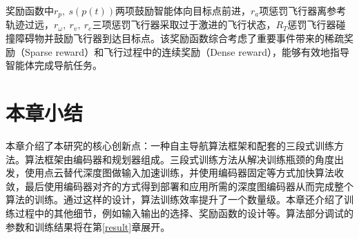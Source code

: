 奖励函数中$r_p,\ s(p(t))$两项鼓励智能体向目标点前进，$r_a$项惩罚飞行器离参考轨迹过远，$r_\omega,\ r_v,\ r_e$三项惩罚飞行器采取过于激进的飞行状态，$R_T$惩罚飞行器碰撞障碍物并鼓励飞行器到达目标点。该奖励函数综合考虑了重要事件带来的稀疏奖励（Sparse reward）和飞行过程中的连续奖励（Dense reward），能够有效地指导智能体完成导航任务。

\section{本章小结}

本章介绍了本研究的核心创新点：一种自主导航算法框架和配套的三段式训练方法。算法框架由编码器和规划器组成。三段式训练方法从解决训练瓶颈的角度出发，使用点云替代深度图做输入加速训练，并使用编码器固定等方式加快算法收敛，最后使用编码器对齐的方式得到部署和应用所需的深度图编码器从而完成整个算法的训练。通过这样的设计，算法训练效率提升了一个数量级。本章还介绍了训练过程中的其他细节，例如输入输出的选择、奖励函数的设计等。算法部分调试的参数和训练结果将在第\ref{result}章展开。


